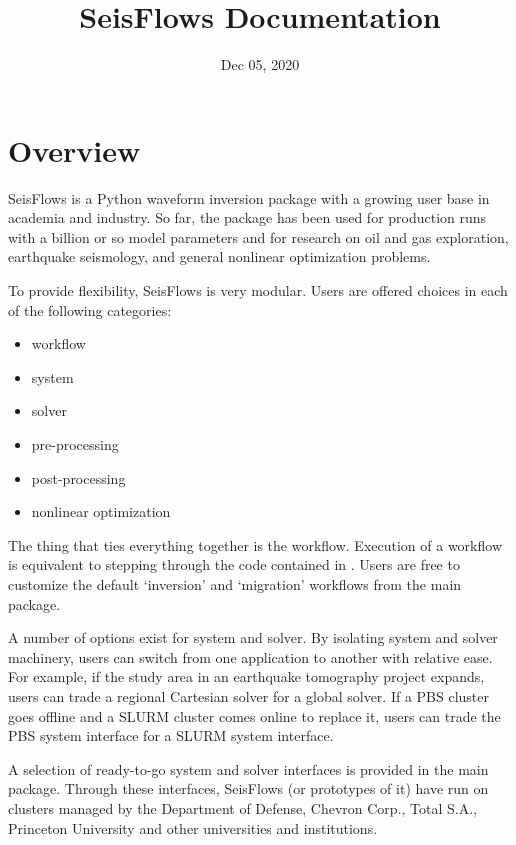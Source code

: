 \documentclass[letterpaper,10pt,english]{sphinxmanual}
\title{SeisFlows Documentation}
\date{Dec 05, 2020}
\author{}
\begin{document}
\pagestyle{empty}
\sphinxmaketitle
\pagestyle{plain}
\sphinxtableofcontents
\pagestyle{normal}
\label{\detokenize{index::doc}}



\chapter{Overview}
\label{\detokenize{index:overview}}
SeisFlows is a Python waveform inversion package with a growing user base in academia and industry. So far, the package has been used for production runs with a billion or so model parameters and for research on oil and gas exploration, earthquake seismology, and general nonlinear optimization problems.

To provide flexibility, SeisFlows is very modular.  Users are offered choices in each of the following categories:
\begin{itemize}
\item {} 
workflow

\item {} 
system

\item {} 
solver

\item {} 
pre-processing

\item {} 
post-processing

\item {} 
nonlinear optimization

\end{itemize}

The thing that ties everything together is the workflow.  Execution of a workflow is equivalent to stepping through the code contained in .  Users are free to customize the default ‘inversion’ and ‘migration’ workflows from the main package.

A number of options exist for system and solver.  By isolating system and solver machinery, users can switch from one application to another with relative ease. For example, if the study area in an earthquake tomography project expands, users can trade a regional Cartesian solver for a global solver.  If a PBS cluster goes offline and a SLURM cluster comes online to replace it, users can trade the PBS system interface for a SLURM system interface.

A selection of ready-to-go system and solver interfaces is provided in the main package.  Through these interfaces, SeisFlows (or prototypes of it) have run on clusters managed by the Department of Defense, Chevron Corp., Total S.A., Princeton University and other universities and institutions.
\end{document}

